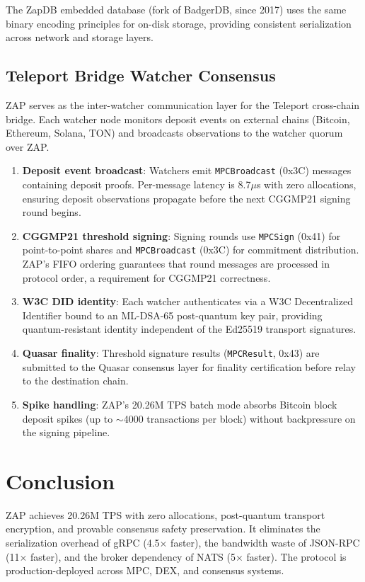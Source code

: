 \documentclass[11pt,letterpaper]{article}
\begin{document}
The ZapDB embedded database (fork of BadgerDB, since 2017) uses the same binary encoding principles for on-disk storage, providing consistent serialization across network and storage layers.

\subsection{Teleport Bridge Watcher Consensus}

ZAP serves as the inter-watcher communication layer for the Teleport cross-chain bridge. Each watcher node monitors deposit events on external chains (Bitcoin, Ethereum, Solana, TON) and broadcasts observations to the watcher quorum over ZAP.

\begin{enumerate}
    \item \textbf{Deposit event broadcast}: Watchers emit \texttt{MPCBroadcast} (0x3C) messages containing deposit proofs. Per-message latency is 8.7$\mu$s with zero allocations, ensuring deposit observations propagate before the next CGGMP21 signing round begins.
    \item \textbf{CGGMP21 threshold signing}: Signing rounds use \texttt{MPCSign} (0x41) for point-to-point shares and \texttt{MPCBroadcast} (0x3C) for commitment distribution. ZAP's FIFO ordering guarantees that round messages are processed in protocol order, a requirement for CGGMP21 correctness.
    \item \textbf{W3C DID identity}: Each watcher authenticates via a W3C Decentralized Identifier bound to an ML-DSA-65 post-quantum key pair, providing quantum-resistant identity independent of the Ed25519 transport signatures.
    \item \textbf{Quasar finality}: Threshold signature results (\texttt{MPCResult}, 0x43) are submitted to the Quasar consensus layer for finality certification before relay to the destination chain.
    \item \textbf{Spike handling}: ZAP's 20.26M TPS batch mode absorbs Bitcoin block deposit spikes (up to $\sim$4000 transactions per block) without backpressure on the signing pipeline.
\end{enumerate}

\section{Conclusion}

ZAP achieves 20.26M TPS with zero allocations, post-quantum transport encryption, and provable consensus safety preservation. It eliminates the serialization overhead of gRPC (4.5$\times$ faster), the bandwidth waste of JSON-RPC (11$\times$ faster), and the broker dependency of NATS (5$\times$ faster). The protocol is production-deployed across MPC, DEX, and consensus systems.
\end{document}
